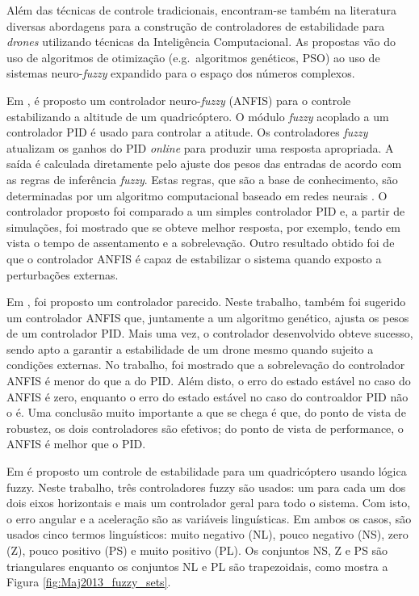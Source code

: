 Além das técnicas de controle tradicionais, encontram-se também na literatura diversas abordagens para a construção de controladores de estabilidade para \textit{drones} utilizando técnicas da Inteligência Computacional. As propostas vão do uso de algoritmos de otimização (e.g.\ algoritmos genéticos, PSO) ao uso de sistemas neuro-\textit{fuzzy} expandido para o espaço dos números complexos.

Em \cite{Rezazadeh2013}, é proposto um controlador neuro-\textit{fuzzy} (ANFIS) para o controle estabilizando a altitude de um quadricóptero. O módulo \textit{fuzzy} acoplado a um controlador PID é usado para controlar a atitude. Os controladores \textit{fuzzy} atualizam os ganhos do PID \textit{online} para produzir uma resposta apropriada. A saída é calculada diretamente pelo ajuste dos pesos das entradas de acordo com as regras de inferência \textit{fuzzy}. Estas regras, que são a base de conhecimento, são determinadas por um algoritmo computacional baseado em redes neurais \cite{Rezazadeh2013}. O controlador proposto foi comparado a um simples controlador PID e, a partir de simulações, foi mostrado que se obteve melhor resposta, por exemplo, tendo em vista o tempo de assentamento e a sobrelevação. Outro resultado obtido foi de que o controlador ANFIS é capaz de estabilizar o sistema quando exposto a perturbações externas.

Em \cite{Mahfouz2013}, foi proposto um controlador parecido. Neste trabalho, também foi sugerido um controlador ANFIS que, juntamente a um algoritmo genético, ajusta os pesos de um controlador PID. Mais uma vez, o controlador desenvolvido obteve sucesso, sendo apto a garantir a estabilidade de um drone mesmo quando sujeito a condições externas. No trabalho, foi mostrado que a sobrelevação do controlador ANFIS é menor do que a do PID. Além disto, o erro do estado estável no caso do ANFIS é zero, enquanto o erro do estado estável no caso do controaldor PID não o é. Uma conclusão muito importante a que se chega é que, do ponto de vista de robustez, os dois controladores são efetivos; do ponto de vista de performance, o ANFIS é melhor que o PID.

Em \cite{Maj2013} é proposto um controle de estabilidade para um quadricóptero usando lógica fuzzy. Neste trabalho, três controladores fuzzy são usados: um para cada um dos dois eixos horizontais e mais um controlador geral para todo o sistema. Com isto, o erro angular e a aceleração são as variáveis linguísticas. Em ambos os casos, são usados cinco termos linguísticos: muito negativo (NL), pouco negativo (NS), zero (Z), pouco positivo (PS) e muito positivo (PL). Os conjuntos NS, Z e PS são triangulares enquanto os conjuntos NL e PL são trapezoidais, como mostra a Figura \ref{fig:Maj2013_fuzzy_sets}. 


